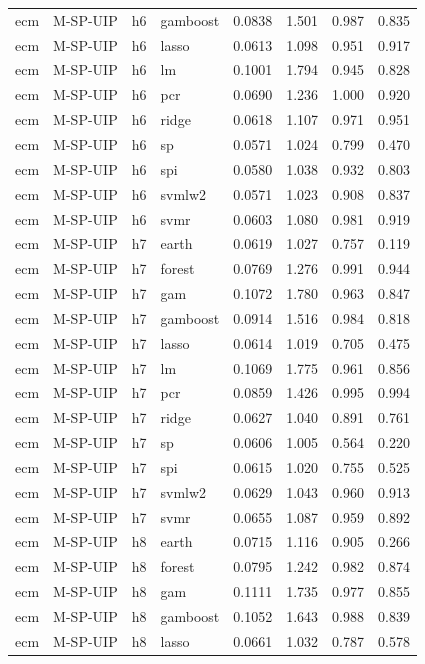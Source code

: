 \begin{ThreePartTable}
\begin{longtable}[t]{llclcccc}
ecm & M-SP-UIP & h6 & gamboost & 0.0838 & 1.501 & 0.987 & 0.835\\
ecm & M-SP-UIP & h6 & lasso & 0.0613 & 1.098 & 0.951 & 0.917\\
ecm & M-SP-UIP & h6 & lm & 0.1001 & 1.794 & 0.945 & 0.828\\
ecm & M-SP-UIP & h6 & pcr & 0.0690 & 1.236 & 1.000 & 0.920\\
ecm & M-SP-UIP & h6 & ridge & 0.0618 & 1.107 & 0.971 & 0.951\\
ecm & M-SP-UIP & h6 & sp & 0.0571 & 1.024 & 0.799 & 0.470\\
ecm & M-SP-UIP & h6 & spi & 0.0580 & 1.038 & 0.932 & 0.803\\
ecm & M-SP-UIP & h6 & svmlw2 & 0.0571 & 1.023 & 0.908 & 0.837\\
ecm & M-SP-UIP & h6 & svmr & 0.0603 & 1.080 & 0.981 & 0.919\\
\addlinespace
ecm & M-SP-UIP & h7 & earth & 0.0619 & 1.027 & 0.757 & 0.119\\
ecm & M-SP-UIP & h7 & forest & 0.0769 & 1.276 & 0.991 & 0.944\\
ecm & M-SP-UIP & h7 & gam & 0.1072 & 1.780 & 0.963 & 0.847\\
ecm & M-SP-UIP & h7 & gamboost & 0.0914 & 1.516 & 0.984 & 0.818\\
ecm & M-SP-UIP & h7 & lasso & 0.0614 & 1.019 & 0.705 & 0.475\\
ecm & M-SP-UIP & h7 & lm & 0.1069 & 1.775 & 0.961 & 0.856\\
ecm & M-SP-UIP & h7 & pcr & 0.0859 & 1.426 & 0.995 & 0.994\\
ecm & M-SP-UIP & h7 & ridge & 0.0627 & 1.040 & 0.891 & 0.761\\
ecm & M-SP-UIP & h7 & sp & 0.0606 & 1.005 & 0.564 & 0.220\\
ecm & M-SP-UIP & h7 & spi & 0.0615 & 1.020 & 0.755 & 0.525\\
ecm & M-SP-UIP & h7 & svmlw2 & 0.0629 & 1.043 & 0.960 & 0.913\\
ecm & M-SP-UIP & h7 & svmr & 0.0655 & 1.087 & 0.959 & 0.892\\
\addlinespace
ecm & M-SP-UIP & h8 & earth & 0.0715 & 1.116 & 0.905 & 0.266\\
ecm & M-SP-UIP & h8 & forest & 0.0795 & 1.242 & 0.982 & 0.874\\
ecm & M-SP-UIP & h8 & gam & 0.1111 & 1.735 & 0.977 & 0.855\\
ecm & M-SP-UIP & h8 & gamboost & 0.1052 & 1.643 & 0.988 & 0.839\\
ecm & M-SP-UIP & h8 & lasso & 0.0661 & 1.032 & 0.787 & 0.578\\

\end{longtable}
\end{ThreePartTable}
